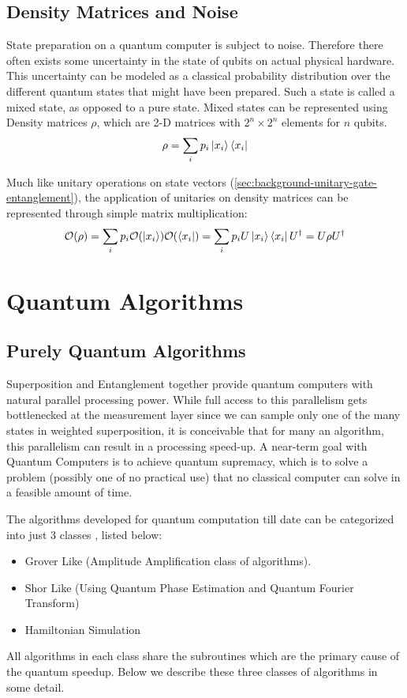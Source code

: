 \subsection{Density Matrices and Noise}

State preparation on a quantum computer is subject to noise. Therefore there often exists some uncertainty in the state of qubits on actual physical hardware. This uncertainty can be modeled as a classical probability distribution over the different quantum states that might have been prepared. Such a state is called a mixed state, as opposed to a pure state. Mixed states can be represented using Density matrices $\rho$, which are 2-D matrices with $2^n \times 2^n$ elements for $n$ qubits.
\begin{equation}
    \rho = \sum_{i} p_i \ket{x_i} \bra{x_i}
\end{equation}

Much like unitary operations on state vectors (\ref{sec:background-unitary-gate-entanglement}), the application of unitaries on density matrices can be represented through simple matrix multiplication:
\begin{equation}
    \mathcal{O} (\rho) = \sum_i p_i \mathcal{O}(\ket{x_i}) \mathcal{O}(\bra{x_i}) = \sum_i p_i U \ket{x_i} \bra{x_i} U^\dagger = U \rho U^\dagger
\end{equation}


\section{Quantum Algorithms}
\label{sec:quantum-algorithms}

\subsection{Purely Quantum Algorithms}

Superposition and Entanglement together provide quantum computers with natural parallel processing power. While full access to this parallelism gets bottlenecked at the measurement layer since we can sample only one of the many states in weighted superposition, it is conceivable that for many an algorithm, this parallelism can result in a processing speed-up. A near-term goal with Quantum Computers is to achieve quantum supremacy, which is to solve a problem (possibly one of no practical use) that no classical computer can solve in a feasible amount of time. \cite{quantum-complexity-survey}

The algorithms developed for quantum computation till date can be categorized into just 3 classes \cite{quantum-algo-shor-3-classes}, listed below:
\begin{itemize}
    \item Grover Like (Amplitude Amplification class of algorithms).
    \item Shor Like (Using Quantum Phase Estimation and Quantum Fourier Transform)
    \item Hamiltonian Simulation 
\end{itemize}
All algorithms in each class share the subroutines which are the primary cause of the quantum speedup. Below we describe these three classes of algorithms in some detail.

